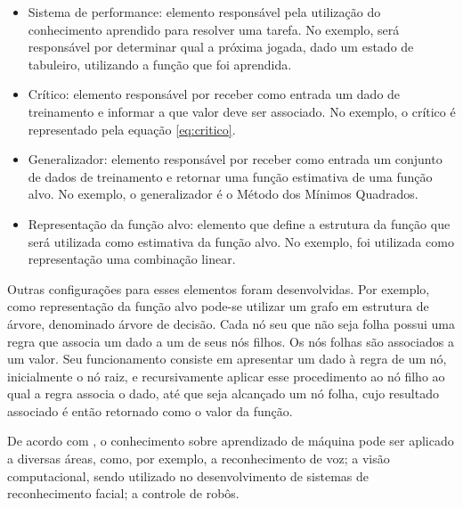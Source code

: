 \begin{itemize}
\item Sistema de performance: elemento responsável pela utilização do conhecimento aprendido para resolver uma tarefa. No exemplo, será responsável por determinar qual a próxima jogada, dado um estado de tabuleiro, utilizando a função que foi aprendida. 
\item Crítico: elemento responsável por receber como entrada um dado de treinamento e informar a que valor deve ser associado. No exemplo, o crítico é representado pela equação \ref{eq:critico}.
\item Generalizador: elemento responsável por receber como entrada um conjunto de dados de treinamento e retornar uma função estimativa de uma função alvo. No exemplo, o generalizador é o Método dos Mínimos Quadrados.
\item Representação da função alvo: elemento que define a estrutura da função que será utilizada como estimativa da função alvo. No exemplo, foi utilizada como representação uma combinação linear.
\end{itemize}

Outras configurações para esses elementos foram desenvolvidas. Por exemplo, como representação da função alvo pode-se utilizar um grafo em estrutura de árvore, denominado árvore de decisão. Cada nó seu que não seja folha possui uma regra que associa um dado a um de seus nós filhos. Os nós folhas são associados a um valor. Seu funcionamento consiste em apresentar um dado à regra de um nó, inicialmente o nó raiz, e recursivamente aplicar esse procedimento ao nó filho ao qual a regra associa o dado, até que seja alcançado um nó folha, cujo resultado associado é então retornado como o valor da função.



De acordo com \cite{Mitchell_discipline}, o conhecimento sobre aprendizado de máquina pode ser aplicado a diversas áreas, como, por exemplo, a reconhecimento de voz; a visão computacional, sendo utilizado no desenvolvimento de sistemas de reconhecimento facial; a controle de robôs.
